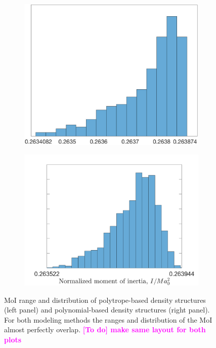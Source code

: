 \documentclass[usenatbib]{mnras}
\newcommand{\TD}[1]{\textcolor{magenta}{\bf [To do] #1}}
\begin{document}
\begin{figure}
    \centering
    \begin{subfigure}{.5\textwidth}
    \includegraphics[width = 1\textwidth]{Figures/histogram.pdf}
    \end{subfigure}%
    \begin{subfigure}{.5\textwidth}
    \includegraphics[width = 1\textwidth]{Figures/jupiter_ppwd_4k_d8_J24_I_hist.png}
    \end{subfigure}
    \caption{MoI range and distribution of polytrope-based density structures (left panel) and polynomial-based density structures (right panel). For both modeling methods the ranges and distribution of the MoI almost perfectly overlap. \TD{make same layout for both plots}}
    \label{fig:histogram}
\end{figure}
\end{document}
